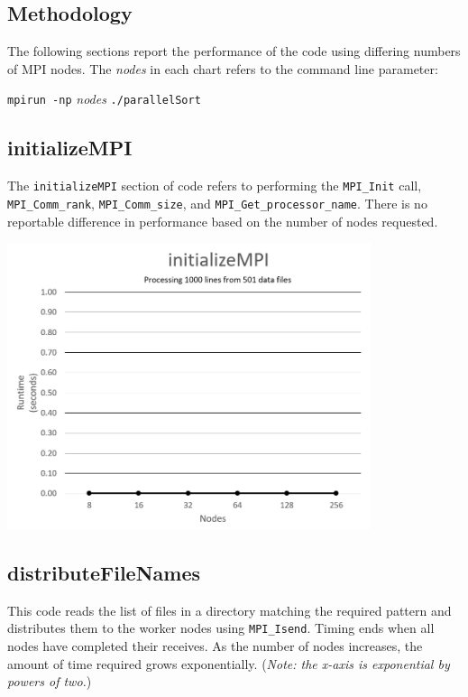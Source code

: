 \subsection{Methodology}

The following sections report the performance of the code using differing numbers of MPI nodes. The \textit{nodes} in each chart refers to the command line parameter:

\texttt{mpirun -np} \textit{nodes} \texttt{./parallelSort}


\subsection{initializeMPI}

The \texttt{initializeMPI} section of code refers to performing the \texttt{MPI\_Init} call, \texttt{MPI\_Comm\_rank}, \texttt{MPI\_Comm\_size}, and \texttt{MPI\_Get\_processor\_name}. There is no reportable difference in performance based on the number of nodes requested.

\includegraphics[width=0.8\textwidth]{initializeMPI.png}

\subsection{distributeFileNames}

This code reads the list of files in a directory matching the required pattern and distributes them to the worker nodes using \texttt{MPI\_Isend}. Timing ends when all nodes have completed their receives. As the number of nodes increases, the amount of time required grows exponentially. (\textit{Note: the x-axis is exponential by powers of two.})

